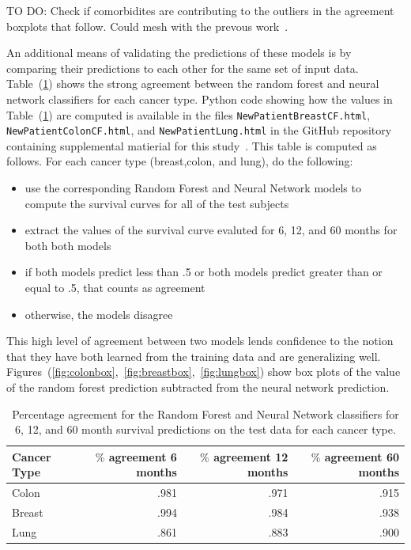 \documentclass[a4paper,11pt]{article}
\newcommand{\codewhite}[1]{\colorbox{white}{\texttt{#1}}}
\begin{document}
TO DO: Check if comorbidites are contributing to the outliers in the agreement boxplots that follow.
Could mesh with the prevous work~\cite{ISI:000355882700012}.


An additional means of validating the predictions of these models is by comparing their predictions to each other for the same set of input data. 
Table~(\ref{tab:agree}) shows the strong agreement between the random forest and neural network classifiers for each cancer type. Python code showing how the values in Table~(\ref{tab:agree}) are computed is available in the files 
\codewhite{NewPatientBreastCF.html}, \codewhite{NewPatientColonCF.html}, and \codewhite{NewPatientLung.html} in the GitHub repository containing supplemental matierial for this study~\cite{supp}. This table is computed as follows. 
For each cancer type (breast,colon, and lung), do the following:

\begin{itemize}[noitemsep]
\item use the corresponding Random Forest and Neural Network models to compute the survival curves for all of the test subjects
\item extract the values of the survival curve evaluted for 6, 12, and 60 months for both both models
\item if both models predict less than .5 or both models predict greater than or equal to .5, that counts as agreement
\item otherwise, the models disagree
\end{itemize}


This high level of agreement between two models lends confidence to the notion that they have both learned from the training data and are generalizing well. Figures~(\ref{fig:colonbox},~\ref{fig:breastbox},~\ref{fig:lungbox}) 
show box plots of the value of the random forest prediction subtracted from the neural network prediction.


\begin{table}[tbp]
\begin{center}
\begin{tabular}{lrrr}
\toprule
Cancer Type & $\%$ agreement 6 months & $\%$ agreement 12 months & $\%$ agreement 60 months \\ 
\midrule
Colon & .981 & .971 & .915 \\  
Breast & .994 & .984 & .938 \\  
Lung & .861 & .883 & .900 \\  
\bottomrule
\end{tabular}
\caption{\label{tab:agree} Percentage agreement for the Random Forest and Neural Network classifiers for 6, 12, and 60 month survival predictions on the test data for each cancer type.}
\end{center}
\end{table}
\end{document}
